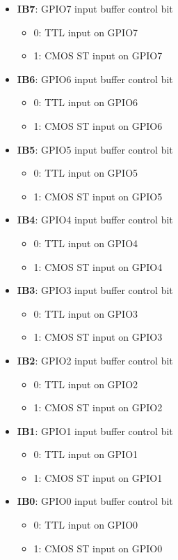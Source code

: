 \documentclass{article}
\begin{document}
	\begin{itemize}
		\item \textbf{IB7}: GPIO7 input buffer control bit
		\begin{itemize}
			\item 0: TTL input on GPIO7
			\item 1: CMOS ST input on GPIO7
		\end{itemize}
		\item \textbf{IB6}: GPIO6 input buffer control bit
		\begin{itemize}
			\item 0: TTL input on GPIO6
			\item 1: CMOS ST input on GPIO6
		\end{itemize}
		\item \textbf{IB5}: GPIO5 input buffer control bit
		\begin{itemize}
			\item 0: TTL input on GPIO5
			\item 1: CMOS ST input on GPIO5
		\end{itemize}
		\item \textbf{IB4}: GPIO4 input buffer control bit
		\begin{itemize}
			\item 0: TTL input on GPIO4
			\item 1: CMOS ST input on GPIO4
		\end{itemize}
		\item \textbf{IB3}: GPIO3 input buffer control bit
		\begin{itemize}
			\item 0: TTL input on GPIO3
			\item 1: CMOS ST input on GPIO3
		\end{itemize}
		\item \textbf{IB2}: GPIO2 input buffer control bit
		\begin{itemize}
			\item 0: TTL input on GPIO2
			\item 1: CMOS ST input on GPIO2
		\end{itemize}
		\item \textbf{IB1}: GPIO1 input buffer control bit
		\begin{itemize}
			\item 0: TTL input on GPIO1
			\item 1: CMOS ST input on GPIO1
		\end{itemize}
		\item \textbf{IB0}: GPIO0 input buffer control bit
		\begin{itemize}
			\item 0: TTL input on GPIO0
			\item 1: CMOS ST input on GPIO0
		\end{itemize}
	\end{itemize}
\end{document}
